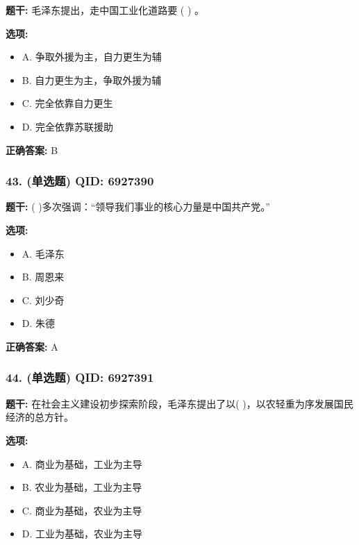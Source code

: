 \documentclass[12pt,UTF8]{ctexart}
\begin{document}
\textbf{题干:}
毛泽东提出，走中国工业化道路要 ( ) 。

\textbf{选项:}
\begin{itemize}[leftmargin=*]

  \item A. 争取外援为主，自力更生为辅

  \item B. 自力更生为主，争取外援为辅

  \item C. 完全依靠自力更生

  \item D. 完全依靠苏联援助

\end{itemize}

\textbf{正确答案:}
B

\vspace{0.3em}\hrulefill\vspace{0.7em}

\subsubsection*{43. (单选题) \small QID: 6927390}

\textbf{题干:}
(      )多次强调：“领导我们事业的核心力量是中国共产党。”

\textbf{选项:}
\begin{itemize}[leftmargin=*]

  \item A. 毛泽东

  \item B. 周恩来

  \item C. 刘少奇

  \item D. 朱德

\end{itemize}

\textbf{正确答案:}
A

\vspace{0.3em}\hrulefill\vspace{0.7em}

\subsubsection*{44. (单选题) \small QID: 6927391}

\textbf{题干:}
在社会主义建设初步探索阶段，毛泽东提出了以(              )，以农轻重为序发展国民经济的总方针。

\textbf{选项:}
\begin{itemize}[leftmargin=*]

  \item A. 商业为基础，工业为主导

  \item B. 农业为基础，工业为主导

  \item C. 商业为基础，农业为主导

  \item D. 工业为基础，农业为主导

\end{itemize}
\end{document}
